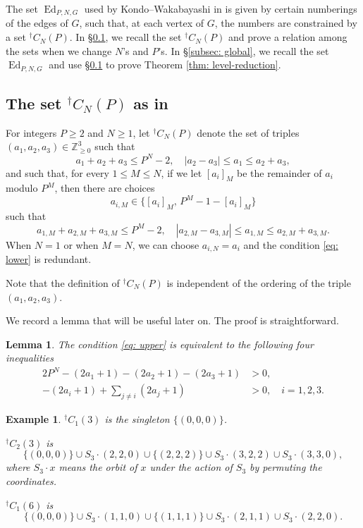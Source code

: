 \documentclass[11pt]{amsart}
\newtheorem{lemma}[theorem]{Lemma}
\newtheorem{example}[theorem]{Example}
\newcommand{\Ed}{\operatorname{Ed}}
\begin{document}
The set $\Ed_{P,N,G}$ used by Kondo--Wakabayashi in \cite{KW} is given by certain numberings of the edges of $G$, such that, at each vertex of $G$, the numbers are constrained by a set ${}^\dagger C_N(P)$.
In \S\ref{subsec: setup}, we recall the set ${}^\dagger C_N(P)$ and prove a relation among the sets when we change $N$'s and $P$'s.
In \S\ref{subsec: global}, we recall the set $\Ed_{P,N,G}$ and use \S\ref{subsec: setup} to prove Theorem \ref{thm: level-reduction}.


\subsection{The set ${}^\dagger C_N(P)$ as in \cite[\S5.1]{KW}}\label{subsec: setup}\;


For integers $P\geq 2$ and $N\geq 1$, let ${}^\dagger C_N(P)$ denote the set of triples $(a_1,a_2,a_3)\in \mathbb{Z}_{\geq 0}^3$ such that 
\begin{equation}\label{eq: upper}
    a_1+a_2+a_3\leq P^N-2,\quad |a_2-a_3|\leq a_1\leq a_2+a_3,
\end{equation}
and such that, for every $1\leq M\leq  N$, if we let $[a_i]_M$ be the remainder of $a_i$ modulo $P^M$, then there are choices
\begin{equation}\label{eq: am}
    a_{i,M}\in \{[a_i]_M,\, P^M-1-[a_i]_M\}
\end{equation}
such that 
\begin{equation}\label{eq: lower}
a_{1,M}+a_{2,M}+a_{3,M}\leq P^M-2,\quad |a_{2,M}-a_{3,M}|\leq a_{1,M}\leq a_{2,M}+a_{3,M}.
\end{equation}
When $N=1$ or when $M=N$, we can choose $a_{i,N}=a_i$ and the condition \eqref{eq: lower} is redundant.

Note that the definition of ${}^\dagger C_N(P)$ is independent of the ordering of the triple $(a_1,a_2,a_3)$.

We record a lemma that will be useful later on. The proof is straightforward.

\begin{lemma}\label{eqn: four ineq}
    The condition \eqref{eq: upper} is equivalent to the following four inequalities
\begin{align*}
    2P^N -(2a_1+1)-(2a_2+1)-(2a_3+1) &>0,\\
    -(2a_i+1)+\sum_{j\neq i}(2a_j+1)&>0, \quad i=1,2,3.
\end{align*}
\end{lemma}

\begin{example}
${}^\dagger C_1(3)$ is the singleton $\{(0,0,0)\}$.

${}^\dagger C_2(3)$ is 
\[\{(0,0,0)\}\cup S_3\cdot (2,2,0)\cup \{(2,2,2)\} \cup S_3\cdot (3,2,2)\cup S_3\cdot (3,3,0),\]
where $S_3\cdot x$ means the orbit of $x$ under the action of $S_3$ by permuting the coordinates.

${}^\dagger C_1(6)$ is 
\[\{(0,0,0)\}\cup S_3\cdot (1,1,0)\cup \{(1,1,1)\} \cup S_3\cdot (2,1,1)\cup S_3\cdot (2,2,0).\]
\end{example}
\end{document}
